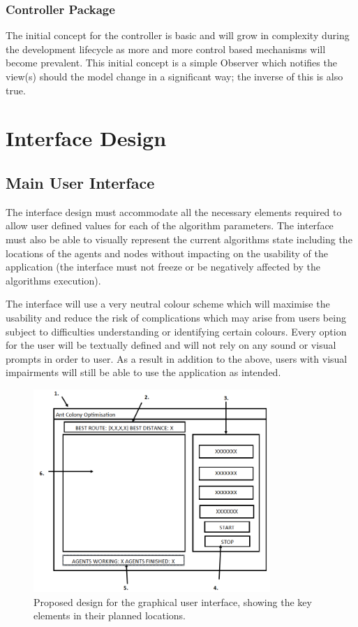 \subsubsection{Controller Package}
The initial concept for the controller is basic and will grow in complexity during the development lifecycle as more and more control based mechanisms will become prevalent. This initial concept is a simple Observer which notifies the view(s) should the model change in a significant way; the inverse of this is also true.

\section{Interface Design}
\subsection{Main User Interface}
\label{ssec:mainUI}
The interface design must accommodate all the necessary elements required to allow user defined values for each of the algorithm parameters. The interface must also be able to visually represent the current algorithms state including the locations of the agents and nodes without impacting on the usability of the application (the interface must not freeze or be negatively affected by the algorithms execution).

The interface will use a very neutral colour scheme which will maximise the usability and reduce the risk of complications which may arise from users being subject to difficulties understanding or identifying certain colours. Every option for the user will be textually defined and will not rely on any sound or visual prompts in order to user. As a result in addition to the above, users with visual impairments will still be able to use the application as intended.

\begin{figure}[H]
\centering
\includegraphics[width=0.8\textwidth]{Images/design/screen}
\caption{Proposed design for the graphical user interface, showing the key elements in their planned locations.}
\label{fig:interface}
\end{figure}

